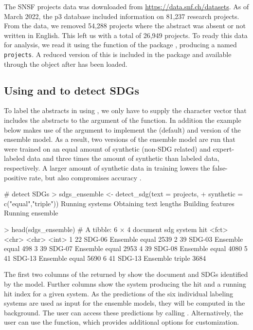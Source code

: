 The SNSF projects data was downloaded from \url{https://data.snf.ch/datasets}. As of March 2022, the p3 database included information on 81,237 research projects. From the data, we removed 54,288  projects where the abstract was absent or not written in English. This left us with a total of 26,949 projects. To ready this data for analysis, we read it using the  function of the  package \citep{readr}, producing a  named \texttt{projects}. A reduced version of this  is included in the  package and available through the  object after  has been loaded. 

\subsection{Using  and  to detect SDGs}

To label the abstracts in  using , we only have to supply the character vector that includes the abstracts to the  argument of the  function. In addition the example below makes use of the  argument to implement the  (default) and  version of the ensemble model. As a result, two versions of the ensemble model are run that were trained on an equal amount of synthetic (non-SDG related) and expert-labeled data and three times the amount of synthetic than labeled data, respectively. A larger amount of synthetic data in training lowers the false-positive rate, but also compromises accuracy \cite[cf.][for more details]{wulff2023using}. 

\begin{example}
# detect SDGs
> sdgs_ensemble <- detect_sdg(text = projects,
+                             synthetic = c("equal","triple"))
Running systems
Obtaining text lengths
Building features
Running ensemble

> head(sdgs_ensemble)
# A tibble: 6 × 4
  document sdg    system            hit
  <fct>    <chr>  <chr>           <int>
1 22       SDG-06 Ensemble equal   2539
2 39       SDG-03 Ensemble equal    498
3 39       SDG-07 Ensemble equal   2953
4 39       SDG-08 Ensemble equal   4080
5 41       SDG-13 Ensemble equal   5690
6 41       SDG-13 Ensemble triple  3684

    
\end{example}

The first two columns of the  returned by  show the document and SDGs identified by the model. Further columns show the system producing the hit and a running hit index for a given system. As the predictions of the six individual labeling systems are used as input for the ensemble models, they will be computed in the background. The user can access these predictions by calling . Alternatively, the user can use the  function, which provides additional options for customization.

